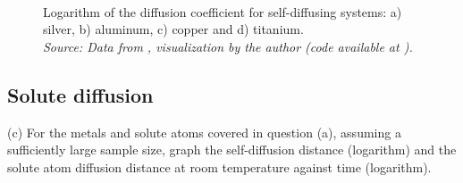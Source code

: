 \begin{figure}[h]
 \centering
 \captionsetup{justification=centering,margin=2cm}
   \\
 \caption{Logarithm of the diffusion coefficient for self-diffusing systems: a) silver, b) aluminum, c) copper and d) titanium.\\ 
 \textit{Source: Data from \citep{kakusan}, visualization by the author (code available at \citep{mygit}).}}
 \label{fig:selfdiff_lnd}
\end{figure}


\subsection{Solute diffusion}



(c) For the metals and solute atoms covered in question (a), assuming a sufficiently large sample size, graph the self-diffusion distance (logarithm) and the solute atom diffusion distance at room temperature against time (logarithm).
